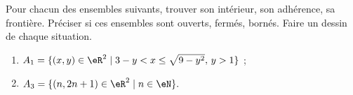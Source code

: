 \begin{exercice}\label{exoDS2011-0001}

Pour chacun des ensembles suivants, trouver son intérieur, son adhérence, sa frontière. Préciser si ces ensembles sont ouverts, fermés, bornés. Faire un dessin de chaque situation.  

	\begin{enumerate}
		\item	
 $A_1 = \{ (x, y ) \in \eR^2 \; | \; 3-y<x\leq \sqrt{9- y^2},\, y>1\} $ ;
                \item
$A_3= \{ (n, 2n+1 ) \in \eR^2 \; | \; n \in \eN\}. $
	\end{enumerate}

\end{exercice}
